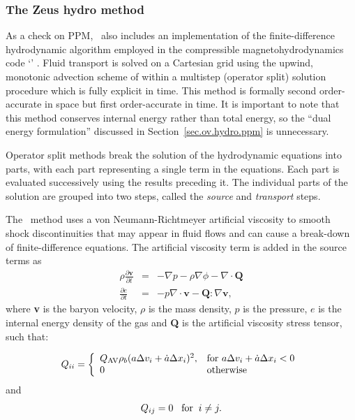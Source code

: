 \subsubsection{The Zeus hydro method}\label{sec.ov.hydro.zeus}


As a check on PPM, \enzo\ also includes an implementation of the
finite-difference hydrodynamic algorithm employed in the compressible 
magnetohydrodynamics code `\zeus'
\citep{Stone92a, Stone92b}.  Fluid transport is solved on a Cartesian
grid using the upwind, monotonic advection scheme of \citet{1977JCoPh..23..276V} 
within a multistep 
(operator split) solution procedure which is fully explicit in time.  
This method is formally second order-accurate in space but 
first order-accurate in time.  It is important to note that 
this method conserves internal energy
rather than total energy, so the ``dual energy
formulation'' discussed in Section~\ref{sec.ov.hydro.ppm} is unnecessary.
 

Operator split methods break
the solution of the hydrodynamic equations into parts, with each part
representing a single term in the equations.  Each part is evaluated
successively using the results preceding it.  The individual parts of
the solution are grouped into two steps, called the \emph{source} and
\emph{transport} steps.

The \zeus\ method uses a von Neumann-Richtmeyer artificial viscosity 
to smooth shock discontinuities that may
appear in fluid flows and can cause a break-down of finite-difference
equations.  The artificial viscosity term is added in the source terms
as
\begin{eqnarray}
\rho \frac{\partial\textbf{v}}{\partial t} &=& - \nabla p - \rho \nabla \phi 
- \nabla \cdot \textbf{Q} \\
\frac{\partial e}{\partial t} &=& -p \nabla \cdot \textbf{v} - \textbf{Q} : \nabla \textbf{v}, 
\end{eqnarray}
where \textbf{v} is the baryon velocity, $\rho$ is the mass density,
$p$ is the pressure, $e$ is the internal energy density of the gas and \textbf{Q}
is the artificial viscosity stress tensor, such that:

\begin{eqnarray}
Q_{ii} = \left\{ \begin{array}{ll}
Q_{\rm AV} \rho_b  (a \Delta v_{i} + \dot{a} \Delta x_i)^2, 
& \textrm{for $a \Delta v_{i} + \dot{a} \Delta x_i < 0$}  \\
0 & \textrm{otherwise}\\
\end{array} \right. 
\end{eqnarray}
and
\begin{equation}
Q_{ij} = 0  \;\;\;{\rm for}\;\; i \ne j .
\end{equation}

